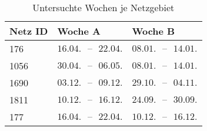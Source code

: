 {
\renewcommand{\arraystretch}{1.2}%
\begin{table}[H]
	\begin{center}
		\caption{Untersuchte Wochen je Netzgebiet}
		\begin{tabu} to 0.6\textwidth {X[0.5] X[1, r] X[1, r]}
			\toprule
			Netz ID	   & Woche A                         & Woche B                         \\ \midrule
			\num{176}  & \(16.04. \text{ {--} } 22.04.\) & \(08.01. \text{ {--} } 14.01.\) \\
			\num{1056} & \(30.04. \text{ {--} } 06.05.\) & \(08.01. \text{ {--} } 14.01.\) \\
			\num{1690} & \(03.12. \text{ {--} } 09.12.\) & \(29.10. \text{ {--} } 04.11.\) \\
			\num{1811} & \(10.12. \text{ {--} } 16.12.\) & \(24.09. \text{ {--} } 30.09.\) \\
			\num{177}  & \(16.04. \text{ {--} } 22.04.\) & \(10.12. \text{ {--} } 16.12.\) \\ \bottomrule
		\end{tabu}
		\label{tab:extreme_weeks}
	\end{center}
	\vspace{-3mm}%
\end{table}
}